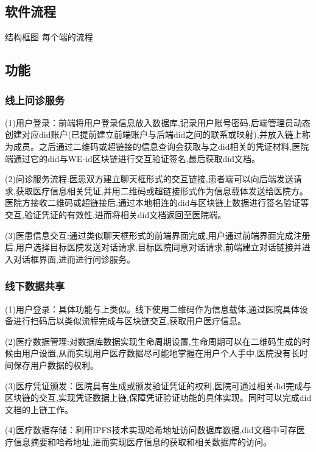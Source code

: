 \documentclass{cumcmthesis}
\numberwithin{equation}{section} %
\numberwithin{figure}{section} %
\numberwithin{table}{section} %
\begin{document}
\subsection{软件流程}

结构框图
每个端的流程

\subsection{功能}

\subsubsection{线上问诊服务}

(1)用户登录：前端将用户登录信息放入数据库,记录用户账号密码,后端管理员动态创建对应did账户(已提前建立前端账户与后端did之间的联系或映射),并放入链上称为成员。之后通过二维码或超链接的信息查询会获取与之did相关的凭证材料,医院端通过它的did与WE-id区块链进行交互验证签名,最后获取did文档。

(2)问诊服务流程:医患双方建立聊天框形式的交互链接,患者端可以向后端发送请求,获取医疗信息相关凭证,并用二维码或超链接形式作为信息载体发送给医院方。医院方接收二维码或超链接后,通过本地相连的did与区块链上数据进行签名验证等交互,验证凭证的有效性,进而将相关did文档返回至医院端。

(3)医患信息交互:通过类似聊天框形式的前端界面完成,用户通过前端界面完成注册后,用户选择目标医院发送对话请求,目标医院同意对话请求,前端建立对话链接并进入对话框界面,进而进行问诊服务。

\subsubsection{线下数据共享}
(1)用户登录：具体功能与上类似。线下使用二维码作为信息载体,通过医院具体设备进行扫码后以类似流程完成与区块链交互,获取用户医疗信息。

(2)医疗数据管理:对数据库数据实现生命周期设置,生命周期可以在二维码生成的时候由用户设置,从而实现用户医疗数据尽可能地掌握在用户个人手中,医院没有长时间保存用户数据的权利。

(3)医疗凭证颁发：医院具有生成或颁发验证凭证的权利,医院可通过相关did完成与区块链的交互,实现凭证数据上链,保障凭证验证功能的具体实现。同时可以完成did文档的上链工作。

(4)医疗数据存储：利用IPFS技术实现哈希地址访问数据库数据,did文档中可存医疗信息摘要和哈希地址,进而实现医疗信息的获取和相关数据库的访问。
\end{document}
